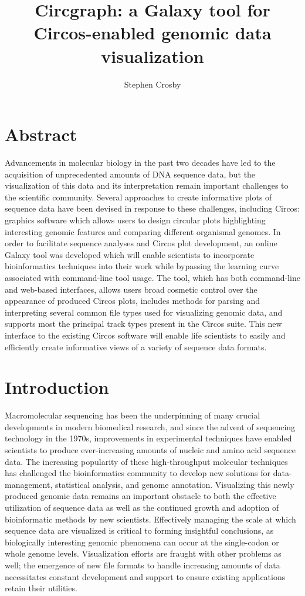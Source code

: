\documentclass[twocolumn]{article}
\title{Circgraph: a Galaxy tool for Circos-enabled genomic data visualization}
\author{Stephen Crosby}
\begin{document}
\maketitle
\section*{Abstract}
Advancements in molecular biology in the past two decades have led to the acquisition of
unprecedented amounts of DNA sequence data, but the visualization of this data and its
interpretation remain important challenges to the scientific community. Several approaches to
create informative plots of sequence data have been devised in response to these challenges, 
including Circos: graphics software which allows users to design circular plots highlighting
interesting genomic features and comparing different organismal genomes. In order to facilitate sequence analyses and Circos plot development, an online Galaxy tool was developed which
will enable scientists to incorporate bioinformatics techniques into their work while bypassing the learning curve associated with command-line tool usage. The tool, which has both command-line and web-based interfaces, allows users broad cosmetic control over the appearance of produced Circos plots, includes methods for parsing and interpreting several common file types used for visualizing genomic data, and supports most the principal track types present in the Circos suite. This new interface to the existing Circos software will enable life scientists to easily and efficiently create informative views of a variety of sequence data formats.

\section*{Introduction}
Macromolecular sequencing has been the underpinning of many crucial developments in modern biomedical research, and since the advent of sequencing technology in the 1970s, improvements in experimental techniques have enabled scientists to produce ever-increasing amounts of nucleic and amino acid sequence data. The increasing popularity of these high-throughput molecular techniques has challenged the bioinformatics community to develop new solutions for data-management, statistical analysis, and genome annotation. Visualizing this newly produced genomic data remains an important obstacle to both the effective utilization of sequence data as well as the continued growth and adoption of bioinformatic methods by new scientists. Effectively managing the scale at which sequence data are visualized is critical to forming insightful conclusions, as biologically interesting genomic phenomena can occur at the single-codon or whole genome levels. Visualization efforts are fraught with other problems as well; the emergence of new file formats to handle increasing amounts of data necessitates constant development and support to ensure existing applications retain their utilities.
\end{document}
